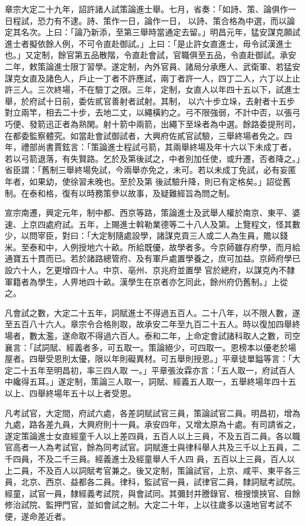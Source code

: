 \begin{pinyinscope}
 章宗大定二十九年，詔許諸人試策論進士舉。七月，省奏：「如詩、策、論俱作一日程試，恐力有不逮。詩、策作一日，論作一日，
 以詩、策合格為中選，而以論定其名次。上曰：「論乃新添，至第三舉時當通定去留。」明昌元年，猛安謀克願試進士者擬依餘人例，不可令直赴御試。」上曰：「是止許女直進士，毋令試漢進士也。」又定制，餘官第五品散階，令直赴會試，官職俱至五品，令直赴御試。承安二年，敕策論進士限丁習學。遂定制，內外官員、諸局分承應人、武衛軍、若猛安謀克女直及諸色人，戶止一丁者不許應試，兩丁者許一人，四丁二人，六丁以上止許三人。三次終場，不在驗丁之限。三年，定制，女直人以年四十五以下，試進士舉，於府試十日前，委佐貳官善射者試射。其制，
 以六十步立垛，去射者十五步對立兩竿，相去二十步，去地二丈，以繩橫約之。弓不限強弱，不計中否，以張弓巧便、發箭迅正者為熟閑。射十箭中兩箭，出繩下至垛者為中選。餘路委提刑司，在都委監察體究。如當赴會試御試者，大興府佐貳官試驗，三舉終場者免之。四年，禮部尚書賈鉉言：「策論進士程試弓箭，其兩舉終場及年十六以下未成丁者，若以弓箭退落，有失賢路。乞於及第後試之，中者別加任使，或升遷，否者降之。」省臣謂：「舊制三舉終場免試，今兩舉亦免之，未可。若以未成丁免試，必有妄匿年者，如果幼，使徐習未晚也。至於及第
 後試驗升降，則已有定格矣。」詔從舊制。在泰和格，復有以時務策參以故事，及疑難經旨為問之制。



 宣宗南遷，興定元年，制中都、西京等路，策論進士及武舉人權於南京、東平、婆速、上京四處府試。五年，上賜進士斡勒業德等二十八人及第。上覽程文，怪其數少，以問宰臣，對曰：「大定制隨處設學，諸謀克貢三人或二人為生員，贍以錢米。至泰和中，人例授地六十畝。所給既優，故學者多。今京師雖存府學，而月給通寶五十貫而已。若於諸路總管府、及有軍戶處置學養之，庶可加益。京師府學已設六十人，乞更增四十人。中京、亳州、京兆府並置學
 官於總府，以謀克內不隸軍籍者為學生，人畀地四十畝。漢學生在京者亦乞同此，餘州府仍舊制。」上從之。



 凡會試之數，大定二十五年，詞賦進士不得過五百人。二十八年，以不限人數，遂至五百八十六人。章宗令合格則取，故承安二年至九百二十五人。時以復加四舉終場者，數太濫，遂命取不得過六百人。泰和二年，上命定會試諸科取人之數，司空襄言：「試詞賦、經義者多，可五取一。策論絕少，可四取一。恩榜本以優老於場屋者。四舉受恩則太優，限以年則礙異材。可五舉則授恩。」平章徒單鎰等言：「大定二十五年至明昌初，率三四人取
 一。」平章張汝霖亦言：「五人取一，府試百人中纔得五耳。」遂定制，策論三人取一，詞賦、經義五人取一，五舉終場年四十五以上、四舉終場年五十以上者受恩。



 凡考試官，大定間，府試六處，各差詞賦試官三員，策論試官二員。明昌初，增為九處，路各差九員，大興府則十一員。承安四年，又增太原為十處。有司請省之，遂定策論進士女直經童千人以上差四員，五百人以上三員，不及五百二員。各以職官高者一人為考試官，餘為同考試官。詞賦進士與律科舉人共及三千以上五員，二千四員，不及二千三員。經義進士及經童舉人千人四
 員，五百以上三員，百人以上二員，不及百人以詞賦考官兼之。後又定制，策論試官，上京、咸平、東平各三員，北京、西京、益都各二員。律科，監試官一員，試律官二員，隸詞賦考試院。經童，試官一員，隸經義考試院，與會試同。其彌封并謄錄官、檢搜懷挾官、自餘修治試院、監押門官，並如會試之制。大定二十年，上以往歲多以遠地官考試不便，遂命差近者。




\end{pinyinscope}
